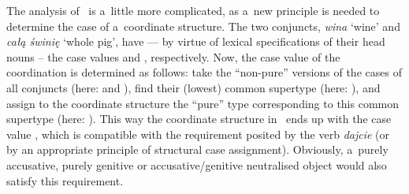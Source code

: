 \documentclass[output=paper]{langsci/langscibook}
\begin{document}
The analysis of~ is a~little more complicated, as a~new principle is needed to determine the case of a~coordinate structure.  The two conjuncts, \emph{wina} ‘wine’ and \emph{całą świnię} ‘whole pig’, have — by virtue of lexical specifications of their head nouns – the case values  and , respectively.  Now, the case value of the coordination is determined as follows: take the “non-pure” versions of the cases of all conjuncts (here:  and ), find their (lowest) common supertype (here: ), and assign to the coordinate structure the “pure” type corresponding to this common supertype (here: ).  This way the coordinate structure in~ ends up with the case value , which is compatible with the  requirement posited by the verb \emph{dajcie} (or by an appropriate principle of structural case assignment).  Obviously, a~purely accusative, purely genitive or accusative/genitive neutralised object would also satisfy this requirement.
\end{document}
